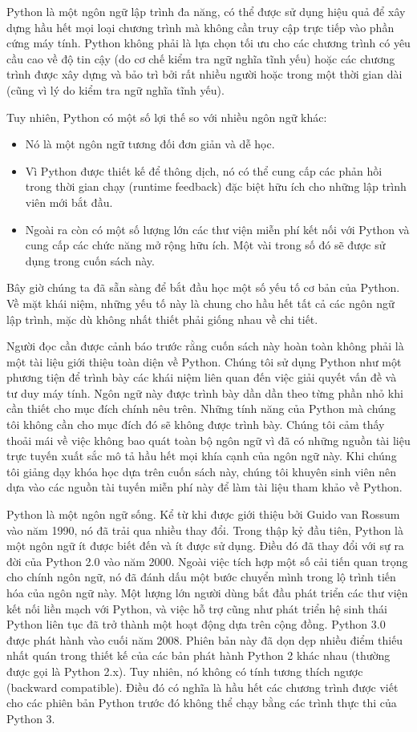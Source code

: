 Python là một ngôn ngữ lập trình đa năng, có thể được sử dụng hiệu quả để xây dựng hầu hết mọi loại chương trình mà không cần truy cập trực tiếp vào phần cứng máy tính. Python không phải là lựa chọn tối ưu cho các chương trình có yêu cầu cao về độ tin cậy (do cơ chế kiểm tra ngữ nghĩa tĩnh yếu) hoặc các chương trình được xây dựng và bảo trì bởi rất nhiều người hoặc trong một thời gian dài (cũng vì lý do kiểm tra ngữ nghĩa tĩnh yếu).

Tuy nhiên, Python có một số lợi thế so với nhiều ngôn ngữ khác:

\begin{itemize}
    \item Nó là một ngôn ngữ tương đối đơn giản và dễ học.
    \item Vì Python được thiết kế để thông dịch, nó có thể cung cấp các phản hồi trong thời gian chạy (runtime feedback) đặc biệt hữu ích cho những lập trình viên mới bắt đầu.
    \item Ngoài ra còn có một số lượng lớn các thư viện miễn phí kết nối với Python và cung cấp các chức năng mở rộng hữu ích. Một vài trong số đó sẽ được sử dụng trong cuốn sách này.
\end{itemize}

Bây giờ chúng ta đã sẵn sàng để bắt đầu học một số yếu tố cơ bản của Python. Về mặt khái niệm, những yếu tố này là chung cho hầu hết tất cả các ngôn ngữ lập trình, mặc dù không nhất thiết phải giống nhau về chi tiết.

Người đọc cần được cảnh báo trước rằng cuốn sách này hoàn toàn không phải là một tài liệu giới thiệu toàn diện về Python. Chúng tôi sử dụng Python như một phương tiện để trình bày các khái niệm liên quan đến việc giải quyết vấn đề và tư duy máy tính. Ngôn ngữ này được trình bày dần dần theo từng phần nhỏ khi cần thiết cho mục đích chính nêu trên. Những tính năng của Python mà chúng tôi không cần cho mục đích đó sẽ không được trình bày. Chúng tôi cảm thấy thoải mái về việc không bao quát toàn bộ ngôn ngữ vì đã có những nguồn tài liệu trực tuyến xuất sắc mô tả hầu hết mọi khía cạnh của ngôn ngữ này. Khi chúng tôi giảng dạy khóa học dựa trên cuốn sách này, chúng tôi khuyên sinh viên nên dựa vào các nguồn tài tuyến miễn phí này để làm tài liệu tham khảo về Python.

Python là một ngôn ngữ sống. Kể từ khi được giới thiệu bởi Guido van Rossum vào năm 1990, nó đã trải qua nhiều thay đổi. Trong thập kỷ đầu tiên, Python là một ngôn ngữ ít được biết đến và ít được sử dụng. Điều đó đã thay đổi với sự ra đời của Python 2.0 vào năm 2000. Ngoài việc tích hợp một số cải tiến quan trọng cho chính ngôn ngữ, nó đã đánh dấu một bước chuyển mình trong lộ trình tiến hóa của ngôn ngữ này. Một lượng lớn người dùng bắt đầu phát triển các thư viện kết nối liền mạch với Python, và việc hỗ trợ cũng như phát triển hệ sinh thái Python liên tục đã trở thành một hoạt động dựa trên cộng đồng. Python 3.0 được phát hành vào cuối năm 2008. Phiên bản này đã dọn dẹp nhiều điểm thiếu nhất quán trong thiết kế của các bản phát hành Python 2 khác nhau (thường được gọi là Python 2.x). Tuy nhiên, nó không có tính tương thích ngược (backward compatible). Điều đó có nghĩa là hầu hết các chương trình được viết cho các phiên bản Python trước đó không thể chạy bằng các trình thực thi của Python 3.

